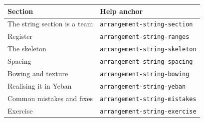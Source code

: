 \begin{helpmapping}
\begin{longtable}{p{}p{}}
\toprule
Section & Help anchor \\
\midrule
The string section is a team & \texttt{arrangement-string-section} \\
Register & \texttt{arrangement-string-ranges} \\
The skeleton & \texttt{arrangement-string-skeleton} \\
Spacing & \texttt{arrangement-string-spacing} \\
Bowing and texture & \texttt{arrangement-string-bowing} \\
Realising it in Yeban & \texttt{arrangement-string-yeban} \\
Common mistakes and fixes & \texttt{arrangement-string-mistakes} \\
Exercise & \texttt{arrangement-string-exercise} \\
\bottomrule
\end{longtable}
\end{helpmapping}
